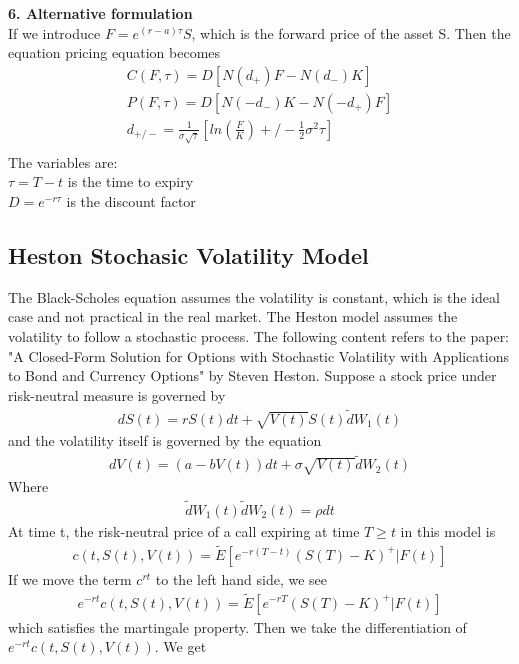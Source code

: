 \documentclass[a4paper]{article}
\begin{document}
{\bf 6. Alternative formulation}\\
If we introduce $F = e^{(r-a)\tau} S$, which is the forward price of the asset S. Then the equation pricing equation becomes
\begin{align*}
	C(F,\tau)= D[N(d_+)F - N(d_-)K] \\
	P(F,\tau)= D[N(-d_-)K - N(-d_+)F] \\
	d_{+/-} = \frac{1}{\sigma \sqrt{\tau}}[ln(\frac{F}{K})+/-\frac{1}{2}\sigma^2 \tau] \\
\end{align*}
The variables are:\\
$\tau = T - t$ is the time to expiry\\
$D = e^{-r\tau}$ is the discount factor \\
\subsection{Heston Stochasic Volatility Model}
The Black-Scholes equation assumes the volatility is constant, which is the ideal case and not practical in the real market. The Heston model assumes the volatility to follow a stochastic process. The following content refers to the paper: "A Closed-Form Solution for Options with Stochastic Volatility with Applications to Bond and Currency Options" by Steven Heston. Suppose a stock price under risk-neutral measure is governed by
\begin{align}
	dS(t) = rS(t)dt + \sqrt{V(t)} S(t) \tilde dW_1(t)
\end{align}
and the volatility itself is governed by the equation
\begin{align}
	dV(t) = (a -bV(t))dt + \sigma \sqrt{V(t)} \tilde dW_2(t)
\end{align}
Where 
\begin{align*}
	\tilde dW_1(t) \tilde dW_2(t) = \rho dt
\end{align*}
At time t, the risk-neutral price of a call expiring at time $T \geq t$ in this model is
\begin{align*}
	c(t, S(t), V(t)) = \tilde E[e^{-r(T-t)}(S(T)-K)^+|F(t)]
\end{align*}
If we move the term $c^{rt}$ to the left hand side, we see
\begin{align}
	e^{-rt}c(t, S(t), V(t)) = \tilde E[e^{-rT}(S(T)-K)^+|F(t)]
\end{align}
which satisfies the martingale property.
Then we take the differentiation of $e^{-rt}c(t, S(t), V(t))$. We get
\end{document}
